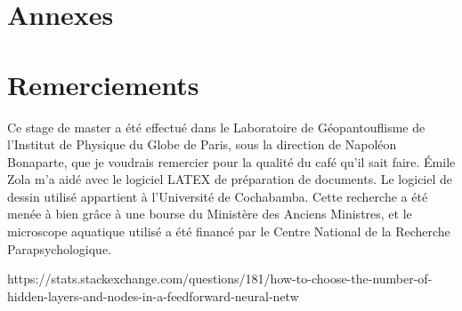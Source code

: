 \documentclass{article}
\begin{document}
\section{Annexes} 

\section*{Remerciements}

Ce stage de master a été effectué dans le Laboratoire de Géopantouflisme de l’Institut de Physique du Globe de Paris, sous la direction de Napoléon Bonaparte, que je voudrais remercier pour la qualité du café qu’il sait faire. Émile Zola m’a aidé avec le logiciel LATEX de préparation de documents. Le logiciel de dessin utilisé appartient à l’Université de Cochabamba. Cette recherche a été menée à bien grâce à une bourse du Ministère des Anciens Ministres, et le microscope aquatique utilisé a été financé par le Centre National de la Recherche Parapsychologique.

https://stats.stackexchange.com/questions/181/how-to-choose-the-number-of-hidden-layers-and-nodes-in-a-feedforward-neural-netw
\end{document}
